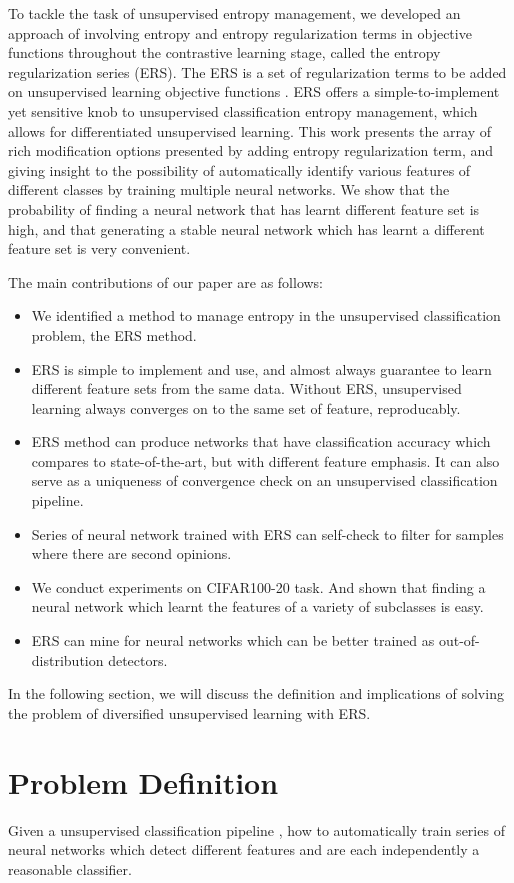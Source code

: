 \documentclass[10pt,twocolumn,letterpaper]{article}
\begin{document}
To tackle the task of unsupervised entropy management, we developed an approach of involving entropy and entropy regularization terms in objective functions throughout the contrastive learning stage, called the entropy regularization series (ERS). The ERS is a set of regularization terms to be added on unsupervised learning objective functions . ERS offers a simple-to-implement yet sensitive knob to unsupervised classification entropy management, which allows for differentiated unsupervised learning. This work presents the array of rich modification options presented by adding entropy regularization term, and giving insight to the possibility of automatically identify various features of different classes by training multiple neural networks. We show that the probability of finding a neural network that has learnt different feature set is high, and that generating a stable neural network which has learnt a different feature set is very convenient.

The main contributions of our paper are as follows:
\begin{itemize} 
\item We identified a method to manage entropy in the unsupervised classification problem, the ERS method.
\item ERS is simple to implement and use, and almost always guarantee to learn different feature sets from the same data. Without ERS, unsupervised learning always converges on to the same set of feature, reproducably. 
\item ERS method can produce networks that have classification accuracy which compares to state-of-the-art, but with different feature emphasis. It can also serve as a uniqueness of convergence check on an unsupervised classification pipeline.
\item Series of neural network trained with ERS can self-check to filter for samples where there are second opinions. 
\item We conduct experiments on CIFAR100-20 task. And shown that finding a neural network which learnt the features of a variety of subclasses is easy.
\item ERS can mine for neural networks which can be better trained as out-of-distribution detectors.
\end{itemize}

In the following section, we will discuss the definition and implications of solving the problem of diversified unsupervised learning with ERS. 

\section{Problem Definition}
Given a unsupervised classification pipeline , how to automatically train series of neural networks which detect different features and are each independently a reasonable classifier. 
\end{document}
